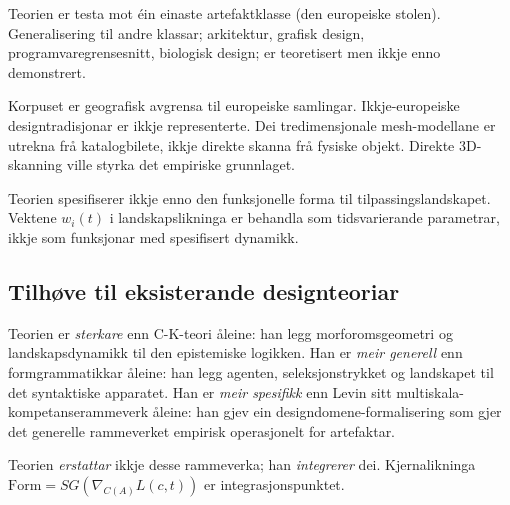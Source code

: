 Teorien er testa mot éin einaste artefaktklasse (den europeiske stolen). Generalisering til andre klassar; arkitektur, grafisk design, programvaregrensesnitt, biologisk design; er teoretisert men ikkje enno demonstrert.

Korpuset er geografisk avgrensa til europeiske samlingar. Ikkje-europeiske designtradisjonar er ikkje representerte. Dei tredimensjonale mesh-modellane er utrekna frå katalogbilete, ikkje direkte skanna frå fysiske objekt. Direkte 3D-skanning ville styrka det empiriske grunnlaget.

Teorien spesifiserer ikkje enno den funksjonelle forma til tilpassingslandskapet. Vektene $w_i(t)$ i landskapslikninga er behandla som tidsvarierande parametrar, ikkje som funksjonar med spesifisert dynamikk.

\subsection{Tilhøve til eksisterande designteoriar}

Teorien er \textit{sterkare} enn C-K-teori åleine: han legg morforomsgeometri og landskapsdynamikk til den epistemiske logikken. Han er \textit{meir generell} enn formgrammatikkar åleine: han legg agenten, seleksjonstrykket og landskapet til det syntaktiske apparatet. Han er \textit{meir spesifikk} enn Levin sitt multiskala-kompetanserammeverk åleine: han gjev ein designdomene-formalisering som gjer det generelle rammeverket empirisk operasjonelt for artefaktar.

Teorien \textit{erstattar} ikkje desse rammeverka; han \textit{integrerer} dei. Kjernalikninga $\mathrm{Form} = SG(\nabla_{C(A)} L(c,t))$ er integrasjonspunktet.
